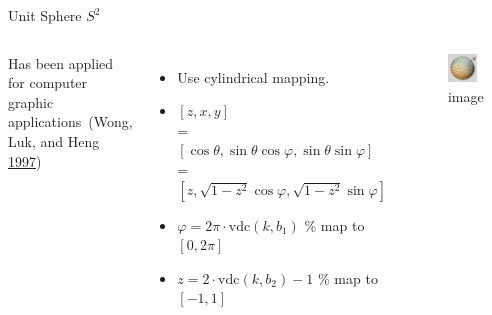 \documentclass[10pt,ignorenonframetext,serif,onlymath]{beamer}
\begin{document}
\begin{frame}{Unit Sphere \(S^2\)}
\protect\hypertarget{unit-sphere-s2}{}

\begin{columns}


Has been applied for computer graphic applications~(Wong, Luk, and Heng
\protect\hyperlink{ref-wong1997sampling}{1997})

\begin{itemize}
\item
  Use cylindrical mapping.
\item
  \([z, x, y]\)\\
  = \([\cos\theta, \sin\theta\cos\varphi, \sin\theta\sin\varphi]\)\\
  = \([z, \sqrt{1-z^2}\cos\varphi, \sqrt{1-z^2}\sin\varphi]\)
\item
  \(\varphi = 2\pi\cdot\mathrm{vdc}(k,b_1)\) \% map to \([0,2\pi]\)
\item
  \(z = 2\cdot\mathrm{vdc}(k,b_2) - 1\) \% map to \([-1,1]\)
\end{itemize}


\begin{figure}
\centering
\includegraphics[width=0.8\textwidth,height=\textheight]{thammer.png}
\caption{image}
\end{figure}

\end{columns}

\end{frame}
\end{document}
